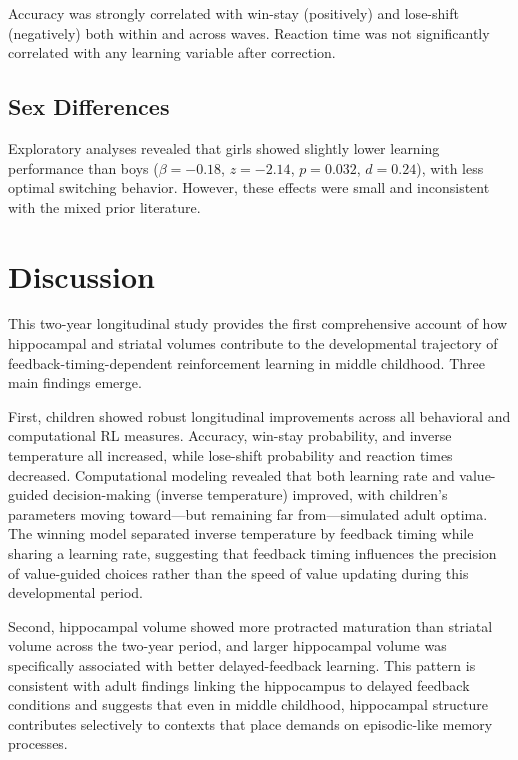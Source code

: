 \documentclass[11pt]{article}
\begin{document}
Accuracy was strongly correlated with win-stay (positively) and lose-shift (negatively) both within and across waves. Reaction time was not significantly correlated with any learning variable after correction.

\subsection{Sex Differences}

Exploratory analyses revealed that girls showed slightly lower learning performance than boys ($\beta = -0.18$, $z = -2.14$, $p = 0.032$, $d = 0.24$), with less optimal switching behavior. However, these effects were small and inconsistent with the mixed prior literature.

\section{Discussion}

This two-year longitudinal study provides the first comprehensive account of how hippocampal and striatal volumes contribute to the developmental trajectory of feedback-timing-dependent reinforcement learning in middle childhood. Three main findings emerge.

First, children showed robust longitudinal improvements across all behavioral and computational RL measures. Accuracy, win-stay probability, and inverse temperature all increased, while lose-shift probability and reaction times decreased. Computational modeling revealed that both learning rate and value-guided decision-making (inverse temperature) improved, with children's parameters moving toward---but remaining far from---simulated adult optima. The winning model separated inverse temperature by feedback timing while sharing a learning rate, suggesting that feedback timing influences the precision of value-guided choices rather than the speed of value updating during this developmental period.

Second, hippocampal volume showed more protracted maturation than striatal volume across the two-year period, and larger hippocampal volume was specifically associated with better delayed-feedback learning. This pattern is consistent with adult findings linking the hippocampus to delayed feedback conditions \citep{foerde2006modulation} and suggests that even in middle childhood, hippocampal structure contributes selectively to contexts that place demands on episodic-like memory processes.
\end{document}
